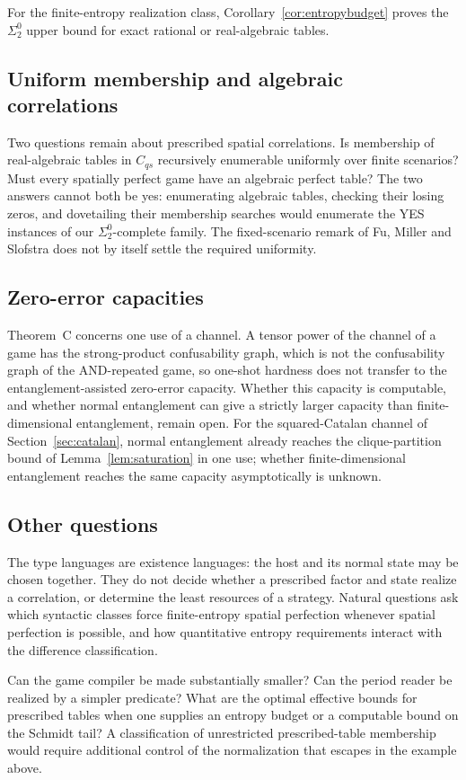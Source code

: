 For the finite-entropy realization class, Corollary~\ref{cor:entropybudget}
proves the $\Sigma^0_2$ upper bound for exact rational or real-algebraic
tables.

\subsection{Uniform membership and algebraic correlations}
Two questions remain about prescribed spatial correlations. Is membership of real-algebraic tables in $C_{qs}$ recursively enumerable uniformly over finite scenarios? Must every spatially perfect game have an algebraic perfect table? The two answers cannot both be yes: enumerating algebraic tables, checking their losing zeros, and dovetailing their membership searches would enumerate the YES instances of our $\Sigma^0_2$-complete family. The fixed-scenario remark of Fu, Miller and Slofstra \cite{FMS} does not by itself settle the required uniformity.

\subsection{Zero-error capacities}\label{sec:capacity}
Theorem~C concerns one use of a channel. A tensor power of the channel of a game has the strong-product confusability graph, which is not the confusability graph of the AND-repeated game, so one-shot hardness does not transfer to the entanglement-assisted zero-error capacity. Whether this capacity is computable, and whether normal entanglement can give a strictly larger capacity than finite-dimensional entanglement, remain open. For the squared-Catalan channel of Section~\ref{sec:catalan}, normal entanglement already reaches the clique-partition bound of Lemma~\ref{lem:saturation} in one use; whether finite-dimensional entanglement reaches the same capacity asymptotically is unknown.

\subsection{Other questions}
The type languages are existence languages: the host and its normal state may be chosen together. They do not decide whether a prescribed factor and state realize a correlation, or determine the least resources of a strategy. Natural questions ask which syntactic classes force finite-entropy spatial perfection whenever spatial perfection is possible, and how quantitative entropy requirements interact with the difference classification.

Can the game compiler be made substantially smaller? Can the period reader be realized by a simpler predicate? What are the optimal effective bounds for prescribed tables when one supplies an entropy budget or a computable bound on the Schmidt tail? A classification of unrestricted prescribed-table membership would require additional control of the normalization that escapes in the example above.
